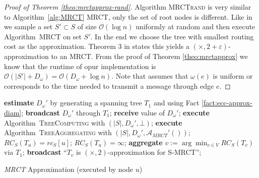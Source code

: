 \documentclass[11pt]{article}
\newcommand{\BO}{\mathcal{O}}
\renewcommand{\epsilon}{\varepsilon}
\newif\iffull
\begin{document}
\begin{proof}[Proof of Theorem \ref{theo:mrctapprox-rand}]
Algorithm \textsc{MRCTrand} is very similar to Algorithm~\ref{alg:MRCT} \textsc{MRCT}, only the set of root nodes is different. 
Like in \cite{hochuli:holzer:MRCST} we sample a set $S'\subset S$ of size $\BO(\log n)$ uniformly at random and then execute Algorithm\iffull~\ref{alg:MRCT}\fi~\textsc{MRCT} on set $S'$. In the end we choose the tree with smallest routing cost as the approximation. Theorem 3 in \cite{hochuli:holzer:MRCST} states this yields a $(\times,2+\epsilon)$-approximation to an MRCT. From the proof of Theorem \ref{theo:mrctapprox} we know that the runtime of opur implementation is $\BO(|S'|+D_\omega)=\BO(D_\omega + \log n)$. Note that \cite{hochuli:holzer:MRCST} assumes that $\omega(e)$ is uniform or corresponds to the time needed to transmit a message through edge $e$.
\end{proof}

\begin{algorithm}[htb]
\begin{algorithmic}[1]
\label{line:MRCTstart}
        \STATE \textbf{estimate} $D_{\omega}'$ by generating a spanning tree $T_1$ and using Fact \ref{fact:ecc-approx-diam};
        \STATE \textbf{broadcast} $D_\omega'$ through $T_1$;
\ELSE
        \STATE \textbf{receive} value of $D_\omega'$;
\ENDIF \label{line:MRCTendestim}
\STATE \textbf{execute} Algorithm\iffull~\ref{alg:TreeComputing}\fi~\textsc{TreeComputing}  with $(|S|,D_\omega', \bot)$; \label{line:MRCTalgdist}
\STATE \textbf{execute} Algorithm\iffull~\ref{alg:TreeAggregating}\fi~\textsc{TreeAggregating}  with $(|S|, D_\omega',\mathcal{A}_{MRCT}'())$; \label{line:MRCTalgagg}
\label{line:MRCTinftystart}
        \STATE $RC_S(T_u)=rc_S[u]$;
\ELSE
        \STATE $RC_S(T_u)=\infty$;
\ENDIF \label{line:MRCTinftyend}
 \label{line:MRCTminstart}
        \STATE \textbf{aggregate} $v:= \arg\min_{v\in V}RC_S(T_v)$ via $T_1$; \label{line:MRCTaggmin}
        \STATE \textbf{broadcast} ``$T_v$ is $(\times,2)$-approximation for S-MRCT''; \label{line:MRCTbroadmin}
\ENDIF \label{line:MRCTminend}
\end{algorithmic}
\caption{\textit{MRCT} Approximation (executed by node $u$)}\label{alg:MRCT}
\vspace*{0.5cm}
\end{algorithm}
\end{document}
